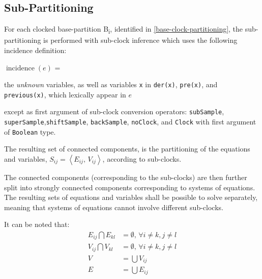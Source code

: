\subsection{Sub-Partitioning}\label{sub-clock-partitioning}

For each clocked base-partition B\textsubscript{i}, identified in \cref{base-clock-partitioning}, the sub-partitioning is performed with sub-clock inference which uses the following incidence definition:

$\operatorname{incidence}(e)$ =
\begin{list}{}{\setlength{\leftmargin}{2em}\setlength{\topsep}{-\parskip}}
\item
the \emph{unknown} variables, as well as variables \lstinline!x! in \lstinline!der(x)!, \lstinline!pre(x)!, and \lstinline!previous(x)!, which lexically appear in $e$
\begin{list}{}{\setlength{\leftmargin}{2em}\setlength{\topsep}{-\parskip}}
\item
except as first argument of sub-clock conversion operators: \lstinline!subSample!, \lstinline!superSample!,\linebreak[4] \lstinline!shiftSample!, \lstinline!backSample!, \lstinline!noClock!, and \lstinline!Clock! with first argument of \lstinline!Boolean! type.
\end{list}
\end{list}\vspace{\parskip}%

The resulting set of connected components, is the partitioning of the equations and variables, $S_{ij} = \left\langle E_{ij},\, V_{ij} \right\rangle$, according to sub-clocks.

The connected components (corresponding to the sub-clocks) are then further split into strongly connected components corresponding to systems of equations.
The resulting sets of equations and variables shall be possible to solve separately, meaning that systems of equations cannot involve different sub-clocks.

It can be noted that:
\begin{equation*}
\begin{aligned}
E_{ij} \bigcap E_{kl} &= \emptyset,\, \forall i\ne{}k, j\ne{}l \\
V_{ij} \bigcap V_{kl} &= \emptyset,\, \forall i\ne{}k, j\ne{}l \\
V &= \bigcup V_{ij} \\
E &= \bigcup E_{ij}
\end{aligned}
\end{equation*}

